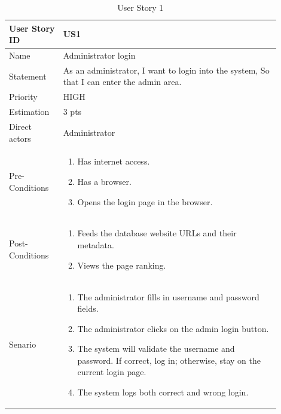 \documentclass{scrartcl}
\begin{document}
\begin{table}[H]
  \caption{User Story 1}
  \begin{tabular}{p{0.18\linewidth} | p{0.72\linewidth}}
    \toprule
    User Story ID & US1
    \\\midrule
    Name & Administrator login
    \\\hline
    Statement & As an administrator, I want to login into the system, So that I can enter the admin area.
    \\\hline
    Priority & HIGH
    \\\hline
    Estimation & 3 pts
    \\\hline
    Direct actors & Administrator
    \\\hline
    Pre-Conditions & {
                     \begin{enumerate}
                     \item Has internet access.
                     \item Has a browser.
                     \item Opens the login page in the browser.
                     \end{enumerate}
                     }\vspace*{-\baselineskip}
    \\\hline
    Post-Conditions & {
                      \begin{enumerate}
                      \item Feeds the database website URLs and their metadata.
                      \item Views the page ranking.
                      \end{enumerate}
                      }\vspace*{-\baselineskip}
    \\\hline
    Senario & {
              \begin{enumerate}
              \item The administrator fills in username and password fields.
              \item The administrator clicks on the admin login button.
              \item The system will validate the username and password. If correct, log in; otherwise, stay on the current login page.
              \item The system logs both correct and wrong login.
              \end{enumerate}
              }\vspace*{-\baselineskip}
    \\\bottomrule
  \end{tabular}
\end{table}
\end{document}
